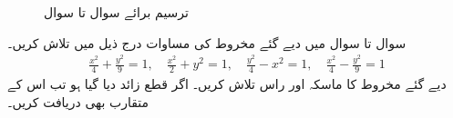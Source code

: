 \begin{figure}
\begin{subfigure}{0.22\textwidth}
\caption{}
\end{subfigure}
\caption{ترسیم برائے سوال  تا سوال }
\label{شکل_مخروط_ترخیم_بائیں_دائیں}
\end{figure}

سوال  تا سوال  میں دیے گئے مخروط کی مساوات درج ذیل میں تلاش کریں۔
\begin{align*}
\frac{x^2}{4}+\frac{y^2}{9}=1,\quad \frac{x^2}{2}+y^2=1,\quad \frac{y^2}{4}-x^2=1,\quad \frac{x^2}{4}-\frac{y^2}{9}=1
\end{align*}
دیے گئے مخروط کا ماسکہ اور راس تلاش کریں۔ اگر قطع زائد دیا گیا ہو تب اس کے متقارب بھی دریافت کریں۔

